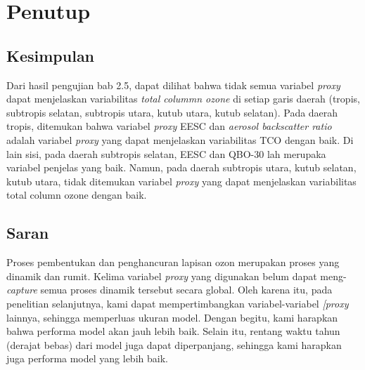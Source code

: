 \chapter{Penutup}



\section{Kesimpulan}
Dari hasil pengujian bab 2.5, dapat dilihat bahwa  tidak semua variabel \textit{proxy}  dapat menjelaskan variabilitas \textit{total colummn ozone} di setiap garis daerah (tropis, subtropis selatan, subtropis utara, kutub utara, kutub selatan). Pada daerah tropis, ditemukan bahwa variabel \textit{proxy} EESC dan \textit{aerosol backscatter ratio} adalah variabel \textit{proxy} yang dapat menjelaskan variabilitas TCO dengan baik. Di lain sisi, pada daerah subtropis selatan, EESC dan QBO-30 lah merupaka variabel penjelas yang baik. Namun, pada daerah subtropis utara, kutub selatan, kutub utara, tidak ditemukan variabel \textit{proxy} yang dapat menjelaskan variabilitas total column ozone dengan baik. 

\section{Saran}
Proses pembentukan dan penghancuran  lapisan ozon merupakan proses yang dinamik dan rumit. Kelima variabel \textit{proxy} yang digunakan belum dapat meng-\textit{capture} semua proses dinamik tersebut secara global. Oleh karena itu, pada penelitian selanjutnya, kami dapat mempertimbangkan variabel-variabel \textit{[proxy} lainnya, sehingga  memperluas ukuran model. Dengan begitu, kami harapkan bahwa performa model akan jauh lebih baik. Selain itu, rentang waktu tahun  (derajat bebas) dari  model juga dapat  diperpanjang, sehingga kami harapkan juga performa model yang lebih baik.

